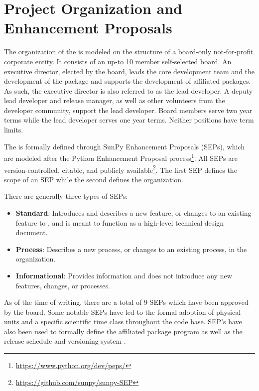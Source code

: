 \section{Project Organization and Enhancement Proposals}
\label{sec:proj_org}

The organization of the \sunpyproj is modeled on the structure of a board-only not-for-profit corporate entity.
It consists of an up-to 10 member self-selected board.
An executive director, elected by the board, leads the core development team and the development of the \sunpypkg  package and supports the development of affiliated packages.
As such, the executive director is also referred to as the lead developer.
A deputy lead developer and release manager, as well as other volunteers from the developer community, support the lead developer.
Board members serve two year terms while the lead developer serves one year terms. Neither positions have term limits.

The \sunpyproj is formally defined through SunPy Enhancement Proposals (SEPs), which are modeled after the Python Enhancement Proposal process\footnote{\url{https://www.python.org/dev/peps/}}.
All SEPs are version-controlled, citable, and publicly available\footnote{\url{https://github.com/sunpy/sunpy-SEP}}.
The first SEP \citep[SEP-0001][]{sep-0001} defines the scope of an SEP \citep[similar to][]{ape-0001} while the second \citep[SEP-0002][]{sep-0002} defines the  \sunpyproj organization.

There are generally three types of SEPs:
\begin{itemize}
    \item \textbf{Standard}: Introduces and describes a new feature, or changes to an existing feature to \sunpypkg, and is meant to function as a high-level technical design document.
    \item \textbf{Process}: Describes a new process, or changes to an existing process, in the organization.
    \item \textbf{Informational}: Provides information and does not introduce any new features, changes, or processes.
\end{itemize}

As of the time of writing, there are a total of 9 SEPs which have been approved by the board.
Some notable SEPs have led to the formal adoption of physical units \citep[SEP-0003,][see \autoref{sec:units}]{sep-0003} and a specific scientific time class \citep[SEP-0008,][see \autoref{sec:units}]{sep-0008} throughout the code base.
SEP's have also been used to formally define the affiliated package program \citep[SEP-0004,][see \autoref{sec:affil_package}]{sep-0004} as well as the release schedule and versioning system \citep[SEP-0009,][see \autoref{sec:release}]{sep-0009}.
